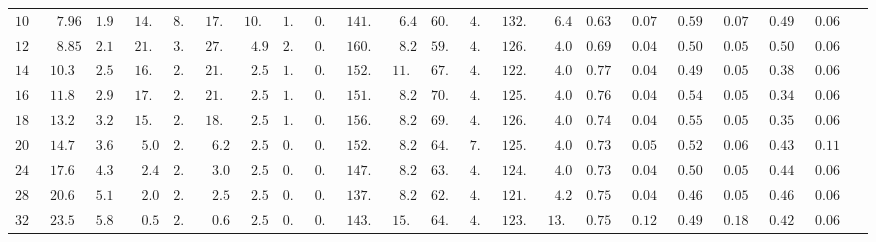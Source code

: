 \documentclass[oldversion]{aa}
\begin{document}
\begin{landscape}
\begin{table}[hbp]
\begin{center}
\begin{tabular}{r r r r r r r r r r r r r r r r r r r r r r}
$   108 $ & $  7.96 $ & $  1.97 $ & $  14.0 $ & $   8.6 $ & $  17.5 $ & $  10.8 $ & $   1.4 $ & $   0.9 $ & $ 141.5 $  & $   6.4 $ & $  60.6 $ & $   4.0 $ & $ 132.9 $ & $   6.4 $ & $  0.638 $ & $  0.071 $ & $  0.593 $ & $  0.075 $ & $  0.490 $ & $  0.061 $\\
$   120 $ & $  8.85 $ & $  2.19 $ & $  21.9 $ & $   3.9 $ & $  27.4 $ & $   4.9 $ & $   2.2 $ & $   0.4 $ & $ 160.0 $  & $   8.2 $ & $  59.5 $ & $   4.0 $ & $ 126.1 $ & $   4.0 $ & $  0.696 $ & $  0.046 $ & $  0.508 $ & $  0.053 $ & $  0.507 $ & $  0.060 $\\
$   140 $ & $ 10.32 $ & $  2.55 $ & $  16.8 $ & $   2.0 $ & $  21.0 $ & $   2.5 $ & $   1.7 $ & $   0.2 $ & $ 152.2 $  & $  11.6 $ & $  67.3 $ & $   4.0 $ & $ 122.6 $ & $   4.0 $ & $  0.777 $ & $  0.041 $ & $  0.497 $ & $  0.056 $ & $  0.385 $ & $  0.064 $\\
$   160 $ & $ 11.80 $ & $  2.91 $ & $  17.5 $ & $   2.0 $ & $  21.8 $ & $   2.5 $ & $   1.7 $ & $   0.2 $ & $ 151.0 $  & $   8.2 $ & $  70.0 $ & $   4.0 $ & $ 125.5 $ & $   4.0 $ & $  0.765 $ & $  0.043 $ & $  0.545 $ & $  0.055 $ & $  0.342 $ & $  0.066 $\\
$   180 $ & $ 13.27 $ & $  3.28 $ & $  15.2 $ & $   2.0 $ & $  18.9 $ & $   2.5 $ & $   1.5 $ & $   0.2 $ & $ 156.4 $  & $   8.2 $ & $  69.1 $ & $   4.2 $ & $ 126.7 $ & $   4.0 $ & $  0.749 $ & $  0.044 $ & $  0.558 $ & $  0.055 $ & $  0.358 $ & $  0.068 $\\
$   200 $ & $ 14.75 $ & $  3.64 $ & $   5.0 $ & $   2.0 $ & $   6.2 $ & $   2.5 $ & $   0.5 $ & $   0.2 $ & $ 152.1 $  & $   8.2 $ & $  64.5 $ & $   7.0 $ & $ 125.8 $ & $   4.0 $ & $  0.732 $ & $  0.057 $ & $  0.527 $ & $  0.060 $ & $  0.431 $ & $  0.111 $\\
$   240 $ & $ 17.69 $ & $  4.37 $ & $   2.4 $ & $   2.0 $ & $   3.0 $ & $   2.5 $ & $   0.2 $ & $   0.2 $ & $ 147.5 $  & $   8.2 $ & $  63.6 $ & $   4.0 $ & $ 124.5 $ & $   4.0 $ & $  0.738 $ & $  0.044 $ & $  0.507 $ & $  0.054 $ & $  0.445 $ & $  0.063 $\\
$   280 $ & $ 20.64 $ & $  5.10 $ & $   2.0 $ & $   2.0 $ & $   2.5 $ & $   2.5 $ & $   0.2 $ & $   0.2 $ & $ 137.5 $  & $   8.2 $ & $  62.5 $ & $   4.0 $ & $ 121.3 $ & $   4.2 $ & $  0.758 $ & $  0.044 $ & $  0.460 $ & $  0.059 $ & $  0.462 $ & $  0.062 $\\
$   320 $ & $ 23.59 $ & $  5.83 $ & $   0.5 $ & $   2.0 $ & $   0.6 $ & $   2.5 $ & $   0.0 $ & $   0.2 $ & $ 143.9 $  & $  15.0 $ & $  64.8 $ & $   4.3 $ & $ 123.2 $ & $  13.7 $ & $  0.757 $ & $  0.122 $ & $  0.496 $ & $  0.182 $ & $  0.425 $ & $  0.068 $\\

\end{tabular}
\end{center}
\end{table}
\end{landscape}
\end{document}
